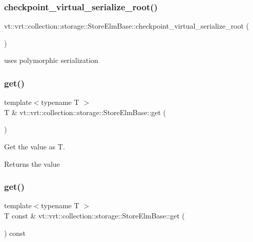 \subsubsection{\texorpdfstring{checkpoint\+\_\+virtual\+\_\+serialize\+\_\+root()}{checkpoint\_virtual\_serialize\_root()}}
{\footnotesize\ttfamily vt\+::vrt\+::collection\+::storage\+::\+Store\+Elm\+Base\+::checkpoint\+\_\+virtual\+\_\+serialize\+\_\+root (\begin{DoxyParamCaption}{ }\end{DoxyParamCaption})}



uses polymorphic serialization 

\mbox{\label{structvt_1_1vrt_1_1collection_1_1storage_1_1_store_elm_base_aa20aab1f18c5c993151f556d03296441}} 
\subsubsection{\texorpdfstring{get()}{get()}\hspace{0.1cm}{\footnotesize\ttfamily [1/2]}}
{\footnotesize\ttfamily template$<$typename T $>$ \\
T \& vt\+::vrt\+::collection\+::storage\+::\+Store\+Elm\+Base\+::get (\begin{DoxyParamCaption}{ }\end{DoxyParamCaption})}



Get the value as {\ttfamily T}. 

\begin{DoxyReturn}{Returns}
the value 
\end{DoxyReturn}
\mbox{\label{structvt_1_1vrt_1_1collection_1_1storage_1_1_store_elm_base_aee7baa6c42334cd792c76888cd07cc18}} 
\subsubsection{\texorpdfstring{get()}{get()}\hspace{0.1cm}{\footnotesize\ttfamily [2/2]}}
{\footnotesize\ttfamily template$<$typename T $>$ \\
T const  \& vt\+::vrt\+::collection\+::storage\+::\+Store\+Elm\+Base\+::get (\begin{DoxyParamCaption}{ }\end{DoxyParamCaption}) const}



